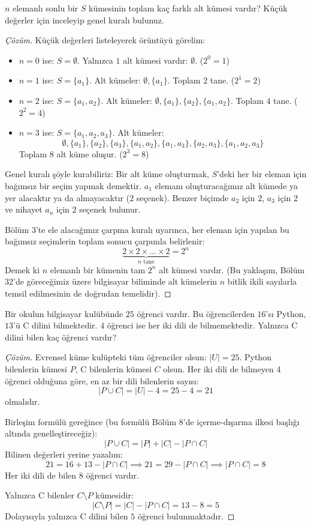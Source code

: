 \begin{example}
$n$ elemanlı sonlu bir $S$ kümesinin toplam kaç farklı alt kümesi vardır? Küçük değerler için inceleyip genel kuralı bulunuz.
\end{example}
\begin{proof}[Çözüm]
Küçük değerleri listeleyerek örüntüyü görelim:
\begin{itemize}
  \item $n = 0$ ise: $S = \emptyset$. Yalnızca $1$ alt kümesi vardır: $\emptyset$. ($2^0 = 1$)
  \item $n = 1$ ise: $S = \{a_1\}$. Alt kümeler: $\emptyset, \{a_1\}$. Toplam $2$ tane. ($2^1 = 2$)
  \item $n = 2$ ise: $S = \{a_1, a_2\}$. Alt kümeler: $\emptyset, \{a_1\}, \{a_2\}, \{a_1, a_2\}$. Toplam $4$ tane. ($2^2 = 4$)
  \item $n = 3$ ise: $S = \{a_1, a_2, a_3\}$. Alt kümeler:
  \[ \emptyset, \{a_1\}, \{a_2\}, \{a_3\}, \{a_1, a_2\}, \{a_1, a_3\}, \{a_2, a_3\}, \{a_1, a_2, a_3\} \]
  Toplam $8$ alt küme oluşur. ($2^3 = 8$)
\end{itemize}
Genel kuralı şöyle kurabiliriz: Bir alt küme oluşturmak, $S$'deki her bir eleman için bağımsız bir seçim yapmak demektir. $a_1$ elemanı oluşturacağımız alt kümede ya yer alacaktır ya da almayacaktır ($2$ seçenek). Benzer biçimde $a_2$ için $2$, $a_3$ için $2$ ve nihayet $a_n$ için $2$ seçenek bulunur.

Bölüm 3'te ele alacağımız çarpma kuralı uyarınca, her eleman için yapılan bu bağımsız seçimlerin toplam sonucu çarpımla belirlenir:
\[ \underbrace{2 \times 2 \times \dots \times 2}_{n \text{ tane}} = 2^n \]
Demek ki $n$ elemanlı bir kümenin tam $2^n$ alt kümesi vardır. (Bu yaklaşım, Bölüm 32'de göreceğimiz üzere bilgisayar biliminde alt kümelerin $n$ bitlik ikili sayılarla temsil edilmesinin de doğrudan temelidir).
\end{proof}

\begin{example}
Bir okulun bilgisayar kulübünde $25$ öğrenci vardır. Bu öğrencilerden $16$'sı Python, $13$'ü C dilini bilmektedir. $4$ öğrenci ise her iki dili de bilmemektedir. Yalnızca C dilini bilen kaç öğrenci vardır?
\end{example}
\begin{proof}[Çözüm]
Evrensel küme kulüpteki tüm öğrenciler olsun: $|U| = 25$. 
Python bilenlerin kümesi $P$, C bilenlerin kümesi $C$ olsun.
Her iki dili de bilmeyen $4$ öğrenci olduğuna göre, en az bir dili bilenlerin sayısı:
\[ |P \cup C| = |U| - 4 = 25 - 4 = 21 \]
olmalıdır.

Birleşim formülü gereğince (bu formülü Bölüm 8'de içerme-dışarma ilkesi başlığı altında genelleştireceğiz):
\[ |P \cup C| = |P| + |C| - |P \cap C| \]
Bilinen değerleri yerine yazalım:
\[ 21 = 16 + 13 - |P \cap C| \implies 21 = 29 - |P \cap C| \implies |P \cap C| = 8 \]
Her iki dili de bilen $8$ öğrenci vardır.

Yalnızca C bilenler $C \setminus P$ kümesidir:
\[ |C \setminus P| = |C| - |P \cap C| = 13 - 8 = 5 \]
Dolayısıyla yalnızca C dilini bilen $5$ öğrenci bulunmaktadır.
\end{proof}

